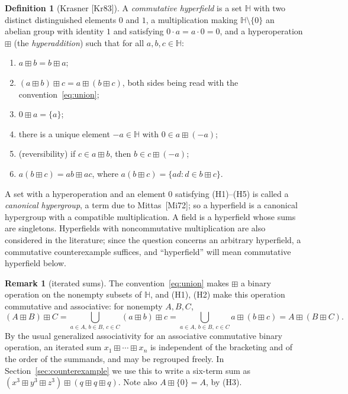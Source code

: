 \documentclass[11pt]{article}
\theoremstyle{plain}
\theoremstyle{definition}
\newtheorem{definition}[theorem]{Definition}
\newtheorem{remark}[theorem]{Remark}
\newcommand{\Hh}{\mathbb{H}}
\newcommand{\bp}{\boxplus}
\begin{document}
\begin{definition}[Krasner {[Kr83]}]\label{def:hyperfield}
A \emph{commutative hyperfield} is a set $\Hh$ with two distinct
distinguished elements $0$ and $1$, a multiplication making
$\Hh\setminus\{0\}$ an abelian group with identity $1$ and satisfying
$0\cdot a=a\cdot 0=0$, and a hyperoperation $\bp$ (the
\emph{hyperaddition}) such that for all $a,b,c\in\Hh$:
\begin{enumerate}
\item[(H1)] $a\bp b=b\bp a$;
\item[(H2)] $(a\bp b)\bp c=a\bp(b\bp c)$, both sides being read with the
convention~\eqref{eq:union};
\item[(H3)] $0\bp a=\{a\}$;
\item[(H4)] there is a unique element $-a\in\Hh$ with $0\in a\bp(-a)$;
\item[(H5)] (reversibility) if $c\in a\bp b$, then $b\in c\bp(-a)$;
\item[(H6)] $a(b\bp c)=ab\bp ac$, where $a(b\bp c)=\{ad:d\in b\bp c\}$.
\end{enumerate}
\end{definition}

A set with a hyperoperation and an element $0$ satisfying (H1)--(H5) is
called a \emph{canonical hypergroup}, a term due to Mittas~[Mi72]; so a
hyperfield is a canonical hypergroup with a compatible multiplication.
A field is a hyperfield whose sums are singletons.  Hyperfields with noncommutative
multiplication are also considered in the literature; since the
question concerns an arbitrary hyperfield, a commutative counterexample
suffices, and ``hyperfield'' will mean commutative hyperfield below.

\begin{remark}[iterated sums]\label{rem:iterated}
The convention~\eqref{eq:union} makes $\bp$ a binary operation on the
nonempty subsets of $\Hh$, and (H1), (H2) make this operation
commutative and associative: for nonempty $A,B,C$,
\[
 (A\bp B)\bp C
 =\bigcup_{a\in A,\,b\in B,\,c\in C}(a\bp b)\bp c
 =\bigcup_{a\in A,\,b\in B,\,c\in C}a\bp(b\bp c)
 =A\bp(B\bp C).
\]
By the usual generalized associativity for an associative commutative
binary operation, an iterated sum $x_1\bp\cdots\bp x_n$ is independent
of the bracketing and of the order of the summands, and may be regrouped
freely.  In Section~\ref{sec:counterexample} we use this to write a
six-term sum as $(x^3\bp y^3\bp z^3)\bp(q\bp q\bp q)$.  Note also
$A\bp\{0\}=A$, by (H3).
\end{remark}
\end{document}
